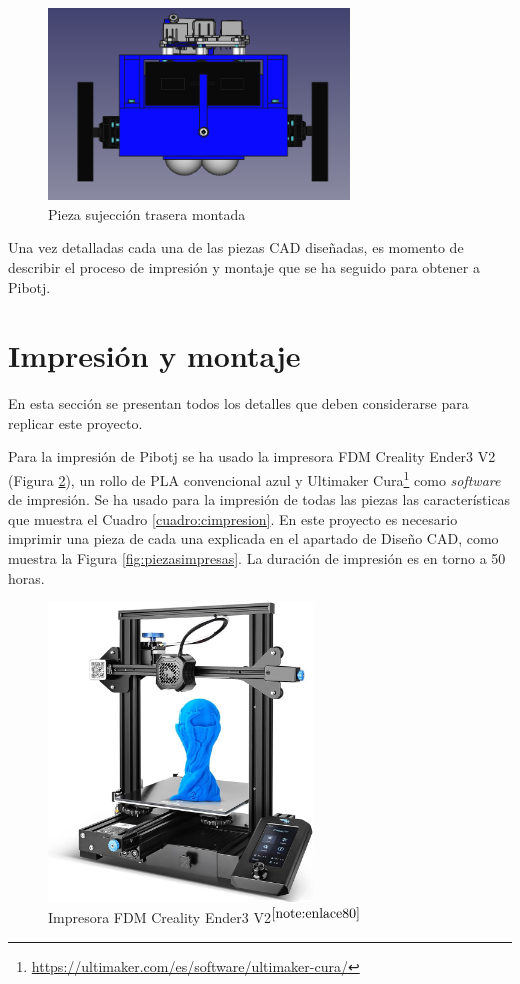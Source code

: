 \begin{figure} [h!]
	\begin{center}
		\includegraphics[width=8cm]{figs/cap5/traseracon.png}
	\end{center}
	\caption{Pieza sujección trasera montada} 
	\label{fig:traseracon}
\end{figure}

Una vez detalladas cada una de las piezas \acs{CAD} diseñadas, es momento de describir el proceso de impresión y montaje que se ha seguido para obtener a Pibotj.
  
\section{Impresión y montaje}

En esta sección se presentan todos los detalles que deben considerarse para replicar este proyecto. 

Para la impresión de Pibotj se ha usado la impresora FDM Creality Ender3 V2 (Figura \ref{fig:impresora}), un rollo de PLA convencional azul y Ultimaker Cura\footnote{\url{https://ultimaker.com/es/software/ultimaker-cura/}} como \textit{software} de impresión. Se ha usado para la impresión de todas las piezas las características que muestra el Cuadro \ref{cuadro:cimpresion}. En este proyecto es necesario imprimir una pieza de cada una explicada en el apartado de Diseño CAD, como muestra la Figura \ref{fig:piezasimpresas}. La duración de impresión es en torno a 50 horas.
 
\begin{figure} [h!]
	\begin{center}
		\includegraphics[width=7cm]{figs/cap5/impresora.jpg}
	\end{center}
	\caption{Impresora FDM Creality Ender3 V2$^{\ref{note:enlace80}}$} 
	\label{fig:impresora}
\end{figure}

